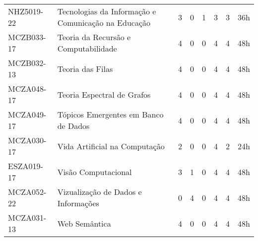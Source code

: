 \documentclass[a4paper]{article}
\begin{document}
\begin{longtable}{|l|l|llll|l|l|}
NHZ5019-22 & Tecnologias da Informação e Comunicação na Educação & 3 & 0 & 1 & 3 & 3 & 36h \\ 
MCZB033-17 & Teoria da Recursão e Computabilidade & 4 & 0 & 0 & 4 & 4 & 48h \\
MCZB032-13 & Teoria das Filas & 4 & 0 & 0 & 4 & 4 & 48h \\
MCZA048-17 & Teoria Espectral de Grafos & 4 & 0 & 0 & 4 & 4 & 48h \\
MCZA049-17 & Tópicos Emergentes em Banco de Dados & 4 & 0 & 0 & 4 & 4 & 48h \\
MCZA030-17 & Vida Artificial na Computação & 2 & 0 & 0 & 4 & 2 & 24h \\
ESZA019-17 & Visão Computacional & 3 & 1 & 0 & 4 & 4 & 48h \\
MCZA052-22 & Vizualização de Dados e Informações & 0 & 4 & 0 & 4 & 4 & 48h \\
MCZA031-13 & Web Semântica & 4 & 0 & 0 & 4 & 4 & 48h \\
\end{longtable}
\end{document}
